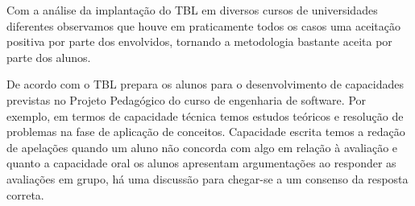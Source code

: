 Com a análise da implantação do TBL em diversos cursos de universidades diferentes observamos que houve em praticamente todos os casos uma aceitação positiva por parte dos envolvidos, tornando a metodologia bastante aceita por parte dos alunos.

De acordo com \cite{ramos} o TBL prepara os alunos para o desenvolvimento de capacidades previstas no Projeto Pedagógico do curso de engenharia de software. Por exemplo, em termos de capacidade técnica temos estudos teóricos e resolução de problemas na fase de aplicação de conceitos. Capacidade escrita temos a redação de apelações quando um aluno não concorda com algo em relação à avaliação e quanto a capacidade oral os alunos apresentam argumentações ao responder as avaliações em grupo, há uma discussão para chegar-se a um consenso da resposta correta.
